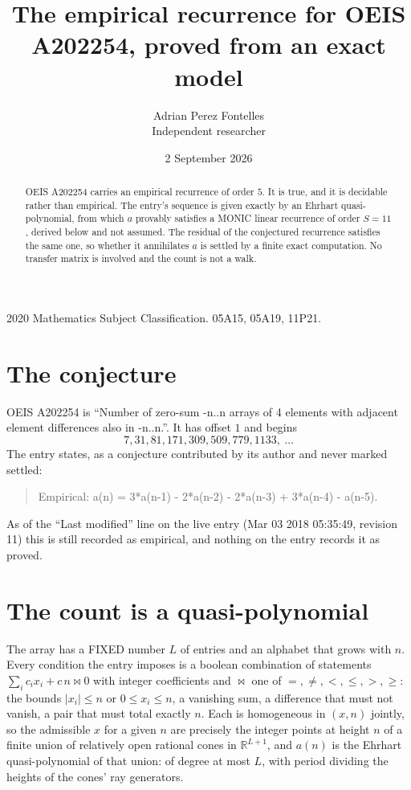 \documentclass[11pt,a4paper]{article}
\title{The empirical recurrence for OEIS A202254, proved from an exact model}
\author{Adrian Perez Fontelles\\ \small Independent researcher}
\date{2 September 2026}
\theoremstyle{plain}
\theoremstyle{definition}
\begin{document}
\maketitle

\begin{abstract}
OEIS A202254 carries an empirical recurrence of order $5$. It is true, and it is
decidable rather than empirical. The entry's sequence is given exactly by an Ehrhart quasi-polynomial, from
which $a$ provably satisfies a MONIC linear recurrence of order $S=11$, derived below and not
assumed. The residual of the conjectured recurrence satisfies the same one, so whether it
annihilates $a$ is settled by a finite exact computation. No transfer matrix is involved and
the count is not a walk.
\end{abstract}

\noindent\small 2020 Mathematics Subject Classification. 05A15, 05A19, 11P21.\normalsize

\section{The conjecture}

OEIS A202254 is ``Number of zero-sum -n..n arrays of 4 elements with adjacent element differences also in -n..n.''. It has offset $1$ and begins
\[
7, 31, 81, 171, 309, 509, 779, 1133,\ \dots
\]
The entry states, as a conjecture contributed by its author and never marked settled:
\begin{quote}
Empirical: a(n) = 3*a(n-1) - 2*a(n-2) - 2*a(n-3) + 3*a(n-4) - a(n-5).
\end{quote}
As of the ``Last modified'' line on the live entry (Mar 03 2018 05:35:49, revision 11)
this is still recorded as empirical, and nothing on the entry records it as proved.

\section{The count is a quasi-polynomial}

The array has a FIXED number $L$ of entries and an alphabet that grows with $n$. Every
condition the entry imposes is a boolean combination of statements
$\sum_i c_ix_i + c\,n \bowtie 0$ with integer coefficients and $\bowtie$ one of
$=,\ne,<,\le,>,\ge$: the bounds $|x_i|\le n$ or $0\le x_i\le n$, a vanishing sum, a difference
that must not vanish, a pair that must total exactly $n$. Each is homogeneous in $(x,n)$
jointly, so the admissible $x$ for a given $n$ are precisely the integer points at height $n$
of a finite union of relatively open rational cones in $\mathbb{R}^{L+1}$, and $a(n)$ is
the Ehrhart quasi-polynomial of that union: of degree at most $L$, with period dividing the
heights of the cones' ray generators.
\end{document}
